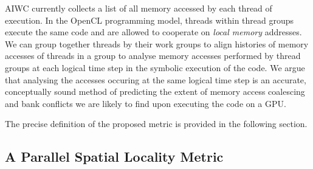 \documentclass[review=false, sigchi]{acmart}
\begin{document}
	AIWC currently collects a list of all memory accessed by each thread of execution. In the OpenCL programming model, threads within thread groups execute the same code and are allowed to cooperate on \textit{local memory} addresses. We can group together threads by their work groups to align histories of memory accesses of threads in a group to analyse memory accesses performed by thread groups at each logical time step in the symbolic execution of the code. We argue that analysing the accesses occuring at the same logical time step is an accurate, conceptually sound method of predicting the extent of memory access coalescing and bank conflicts we are likely to find upon executing the code on a GPU.
	
	The precise definition of the proposed metric is provided in the following section.
	
	\subsection{A Parallel Spatial Locality Metric}
	
\end{document}
